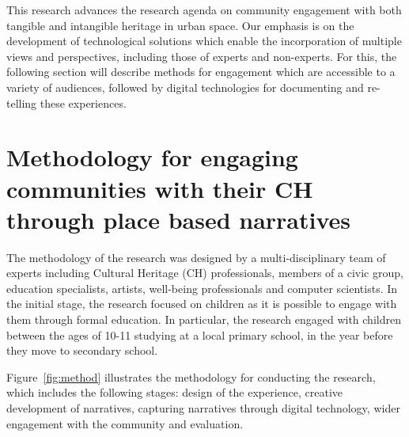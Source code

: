 \documentclass[acmlarge,screen,dvipsnames]{acmart}
\begin{document}
This research advances the research agenda on community engagement with both
tangible and intangible heritage in urban space. Our emphasis is on the
development of technological solutions which enable the incorporation of multiple
views and perspectives, including those of experts and non-experts. For this,
the following section will  describe methods for engagement which are
accessible to a variety of audiences, followed by digital technologies for
documenting and re-telling these experiences. 


\section{Methodology for engaging communities with their CH through place
based narratives} 
\label{meth} The methodology of the research was designed by
a multi-disciplinary team of experts including Cultural Heritage (CH)
professionals, members of a civic group, education specialists, artists,
well-being professionals and computer scientists. In the initial stage, the
research focused on children as it is possible to engage with them through
formal education. In particular, the research engaged with children between
the ages of 10-11 studying at a local primary school, in the year before they
move to secondary school.

Figure~\ref{fig:method} illustrates the methodology for conducting the
research, which includes the following stages: design of the experience,
creative development of narratives, capturing narratives through digital
technology, wider engagement with the community and evaluation.
\end{document}
